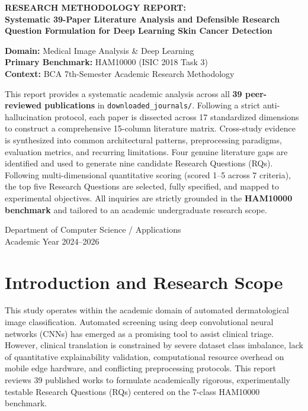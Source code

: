 \documentclass[11pt,a4paper]{article}
\begin{document}
\begin{titlepage}
\centering
\vspace*{1.5cm}
{\Large\textbf{RESEARCH METHODOLOGY REPORT:}\\[0.3cm]
\LARGE\textbf{Systematic 39-Paper Literature Analysis and Defensible Research Question Formulation for Deep Learning Skin Cancer Detection}\par}
\vspace{1.0cm}
{\large\textbf{Domain:} Medical Image Analysis \& Deep Learning \\
\textbf{Primary Benchmark:} HAM10000 (ISIC 2018 Task 3) \\
\textbf{Context:} BCA 7th-Semester Academic Research Methodology\par}
\vspace{1.5cm}
\begin{tcolorbox}[colback=blue!5!white,colframe=blue!75!black,title=\textbf{Methodological Executive Summary}]
This report provides a systematic academic analysis across all \textbf{39 peer-reviewed publications} in \texttt{downloaded\_journals/}. 
Following a strict anti-hallucination protocol, each paper is dissected across 17 standardized dimensions to construct a 
comprehensive 15-column literature matrix. Cross-study evidence is synthesized into common architectural patterns, preprocessing 
paradigms, evaluation metrics, and recurring limitations. Four genuine literature gaps are identified and used to generate 
nine candidate Research Questions (RQs). Following multi-dimensional quantitative scoring (scored 1--5 across 7 criteria), 
the top five Research Questions are selected, fully specified, and mapped to experimental objectives. All inquiries are strictly 
grounded in the \textbf{HAM10000 benchmark} and tailored to an academic undergraduate research scope.
\end{tcolorbox}
\vfill
{\large Department of Computer Science / Applications \\ Academic Year 2024--2026\par}
\end{titlepage}

\newpage
\tableofcontents
\newpage

\section{Introduction and Research Scope}
This study operates within the academic domain of automated dermatological image classification. Automated screening using deep convolutional neural networks (CNNs) has emerged as a promising tool to assist clinical triage. However, clinical translation is constrained by severe dataset class imbalance, lack of quantitative explainability validation, computational resource overhead on mobile edge hardware, and conflicting preprocessing protocols. This report reviews 39 published works to formulate academically rigorous, experimentally testable Research Questions (RQs) centered on the 7-class HAM10000 benchmark.
\end{document}
